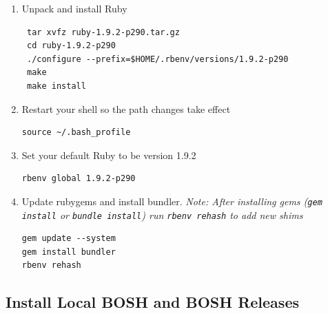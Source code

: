 \begin{enumerate}
\item Unpack and install Ruby

\begin{verbatim}
 tar xvfz ruby-1.9.2-p290.tar.gz
 cd ruby-1.9.2-p290
 ./configure --prefix=$HOME/.rbenv/versions/1.9.2-p290
 make
 make install
\end{verbatim}


\item Restart your shell so the path changes take effect

\begin{verbatim}
source ~/.bash_profile
\end{verbatim}


\item Set your default Ruby to be version 1.9.2

\begin{verbatim}
rbenv global 1.9.2-p290
\end{verbatim}


\item Update rubygems and install bundler. \emph{Note: After installing gems (\texttt{gem install} or \texttt{bundle install}) run \texttt{rbenv rehash} to add new shims}

\begin{verbatim}
gem update --system
gem install bundler
rbenv rehash
\end{verbatim}


\end{enumerate}

\subsection{Install Local BOSH and BOSH Releases}
\label{installlocalboshandboshreleases}

